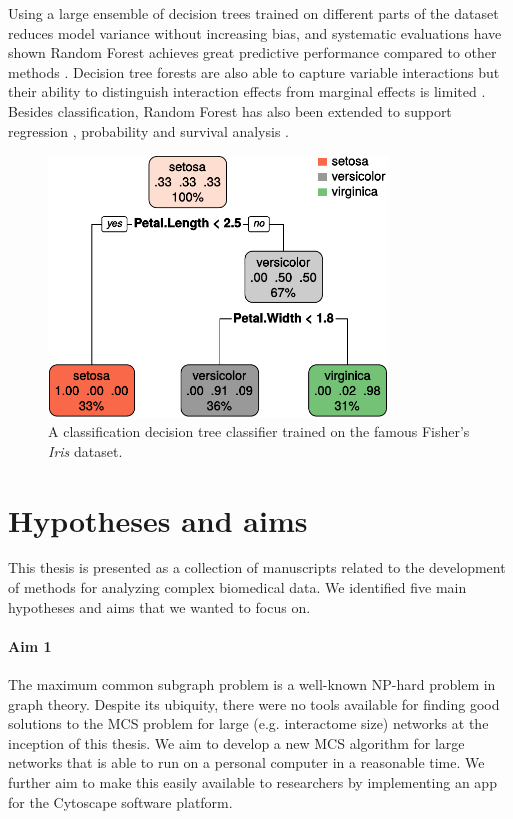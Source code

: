 Using a large ensemble of decision trees trained on different parts of the dataset reduces model variance without increasing bias, and systematic evaluations have shown Random Forest achieves great predictive performance compared to other methods \cite{Caruana2006,Caruana2008}. Decision tree forests are also able to capture variable interactions but their ability to distinguish interaction effects from marginal effects is limited \cite{Lunetta2004,McKinney2006,Wright2016}. Besides classification, Random Forest has also been extended to support regression \cite{Breiman2001}, probability \cite{Malley2012} and survival analysis \cite{Ishwaran2008}.
%
\begin{figure}
    \centering
    \includegraphics[width=9cm]{figures/rpart_iris.pdf}
    \caption{A classification decision tree classifier trained on the famous Fisher's \emph{Iris} dataset.}
    \label{fig:rpart_iris}
\end{figure}

\clearpage
\section{Hypotheses and aims}
This thesis is presented as a collection of manuscripts related to the development of methods for analyzing complex biomedical data. We identified five main hypotheses and aims that we wanted to focus on.

\paragraph{Aim 1}
The maximum common subgraph problem is a well-known NP-hard problem in graph theory. Despite its ubiquity, there were no tools available for finding good solutions to the MCS problem for large (e.g. interactome size) networks at the inception of this thesis. We aim to develop a new MCS algorithm for large networks that is able to run on a personal computer in a reasonable time. We further aim to make this easily available to researchers by implementing an app for the Cytoscape software platform.

